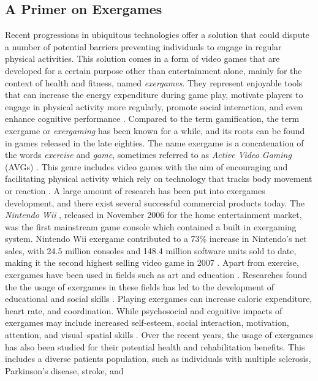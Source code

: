 \subsection{A Primer on Exergames}
Recent progressions in ubiquitous technologies offer a solution that could dispute a number of potential barriers preventing individuals to engage in regular physical activities. This solution comes in a form of video games that are developed for a certain purpose other than entertainment alone, mainly for the context of health and fitness, named \textit{exergames}. They represent enjoyable tools that can increase the energy expenditure during game play, motivate players to engage in physical activity more regularly, promote social interaction, and even enhance cognitive performance \cite{staiano2011exergames}. Compared to the term gamification, the term exergame or \textit{exergaming} has been known for a while, and its roots can be found in games released in the late eighties. The name exergame is a concatenation of the words \textit{exercise} and \textit{game}, sometimes referred to as \textit{Active Video Gaming} (AVGs) \cite{altamimi2012survey}. This genre includes video games with the aim of encouraging and facilitating physical activity which rely on technology that tracks body movement or reaction \cite{altamimi2012survey}. A large amount of research has been put into exergames development, and there exist several successful commercial
products today. The \textit{Nintendo Wii} \cite{wii}, released in November 2006 for the home entertainment market, was the first mainstream game console which contained a built in exergaming system. Nintendo Wii exergame contributed to a 73\% increase in Nintendo's net sales, with 24.5 million consoles and 148.4 million software units sold to date, making it the second highest selling video game in 2007 \cite{staiano2011exergames}. Apart from exercise, exergames have been used in fields such as art and education \cite{altamimi2012survey}. Researches found the the usage of exergames in these fields has led to the 
development of educational and social skills \cite{altamimi2012survey}. Playing exergames can increase caloric expenditure, heart rate, and coordination. While psychosocial and cognitive impacts of exergames may include increased self-esteem, social interaction, motivation, attention, and visual–spatial skills \cite{staiano2011exergames}. Over the recent years, the usage of exergames has also been studied for their potential health and rehabilitation benefits. This includes a diverse patients population, such as individuals with multiple sclerosis, Parkinson’s disease, stroke, and
